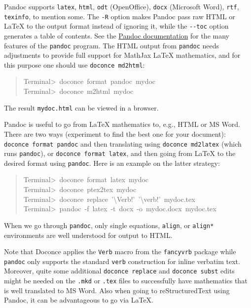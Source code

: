 \documentclass[a4paper]{article}
\begin{document}
Pandoc supports \texttt{latex}, \texttt{html}, \texttt{odt} (OpenOffice), \texttt{docx} (Microsoft
Word), \texttt{rtf}, \texttt{texinfo}, to mention some. The \texttt{-R} option makes
Pandoc pass raw HTML or LaTeX to the output format instead of ignoring it,
while the \texttt{-{}-toc} option generates a table of contents.
See the \href{http://johnmacfarlane.net/pandoc/README.html}{Pandoc documentation}
for the many features of the \texttt{pandoc} program. The HTML output from
\texttt{pandoc} needs adjustments to provide full support for MathJax LaTeX
mathematics, and for this purpose one should use \texttt{doconce md2html}:
%
\begin{quote}{\ttfamily \raggedright \noindent
Terminal>~doconce~format~pandoc~mydoc\\
Terminal>~doconce~m2html~mydoc
}
\end{quote}

The result \texttt{mydoc.html} can be viewed in a browser.

Pandoc is useful to go from LaTeX mathematics to, e.g., HTML or MS
Word.  There are two ways (experiment to find the best one for your
document): \texttt{doconce format pandoc} and then translating using \texttt{doconce
md2latex} (which runs \texttt{pandoc}), or \texttt{doconce format latex}, and then
going from LaTeX to the desired format using \texttt{pandoc}.
Here is an example on the latter strategy:
%
\begin{quote}{\ttfamily \raggedright \noindent
Terminal>~doconce~format~latex~mydoc\\
Terminal>~doconce~ptex2tex~mydoc\\
Terminal>~doconce~replace~'\textbackslash{}Verb!'~'\textbackslash{}verb!'~mydoc.tex\\
Terminal>~pandoc~-f~latex~-t~docx~-o~mydoc.docx~mydoc.tex
}
\end{quote}

When we go through \texttt{pandoc}, only single equations, \texttt{align}, or \texttt{align*}
environments are well understood for output to HTML.

Note that Doconce applies the \texttt{Verb} macro from the \texttt{fancyvrb} package
while \texttt{pandoc} only supports the standard \texttt{verb} construction for
inline verbatim text.  Moreover, quite some additional \texttt{doconce
replace} and \texttt{doconce subst} edits might be needed on the \texttt{.mkd} or
\texttt{.tex} files to successfully have mathematics that is well translated
to MS Word.  Also when going to reStructuredText using Pandoc, it can
be advantageous to go via LaTeX.
\end{document}
